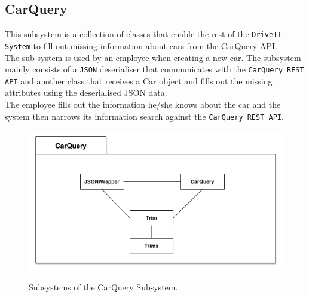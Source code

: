 \subsection{CarQuery} 
This subsystem is a collection of classes that enable the rest of the \texttt{DriveIT System} to fill out missing information about cars from the CarQuery API.\\
The sub system is used by an employee when creating a new car. The subsystem mainly consists of a \texttt{JSON} deserialiser that communicates with the \texttt{CarQuery REST API} and another class that receives a Car object and fills out the missing attributes using the deserialised JSON data. \\
The employee fills out the information he/she knows about the car and the system then narrows its information search against the \texttt{CarQuery REST API}.
\begin{figure}[H]
	\centering
	\includegraphics[scale=0.60]{Figures/CarQuerySubsystemDecomposition}\\
	\caption{Subsystems of the CarQuery Subsystem.}
\end{figure}